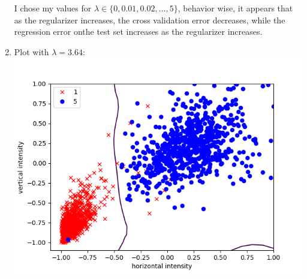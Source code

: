 \documentclass{article}
\begin{document}
\begin{enumerate}
        I chose my values for $\lambda \in \{0, 0.01, 0.02, ..., 5\}$, behavior wise, it appears that as the regularizer increases, the cross validation error decreases, while the regression error onthe test set increases as the regularizer increases.
        \item Plot with $\lambda = 3.64$: \\\includegraphics[scale=0.5]{images/bestReg.png}
    \end{enumerate}
\end{document}
